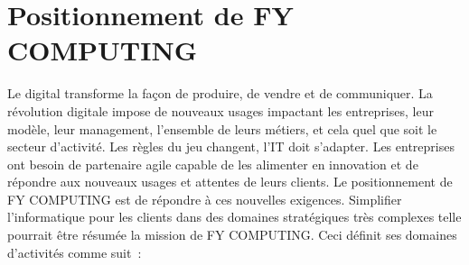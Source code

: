 \documentclass[a4paper,11pt,oneside]{report}
\begin{document}
\section{Positionnement de FY COMPUTING}
Le digital transforme la façon de produire, de vendre et de communiquer. La révolution digitale impose de nouveaux usages impactant les entreprises, leur modèle, leur management, l’ensemble de leurs métiers, et cela quel que soit le secteur d’activité. Les règles du jeu changent, l’IT doit s’adapter. Les entreprises ont besoin de partenaire agile capable de les alimenter en innovation et de répondre aux nouveaux usages et attentes de leurs clients. Le positionnement de FY COMPUTING est de répondre à ces nouvelles exigences.
\newline
\newline
Simplifier l’informatique pour les clients dans des domaines stratégiques très complexes telle pourrait être résumée la mission de FY COMPUTING. Ceci définit ses domaines d’activités comme suit :
\end{document}
